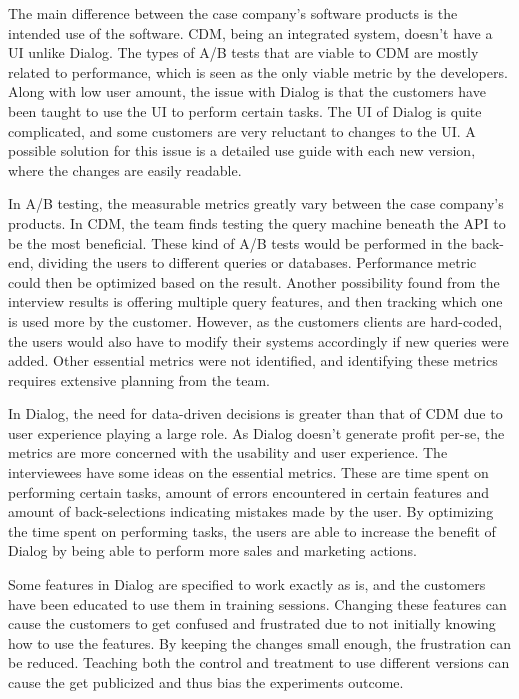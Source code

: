 \documentclass[english]{tktltiki2}
\theoremstyle{definition}
\theoremstyle{remark}
\begin{document}
The main difference between the case company's software products is the intended use of the software. CDM, being an integrated system, doesn't have a UI unlike Dialog. The types of A/B tests that are viable to CDM are mostly related to performance, which is seen as the only viable metric by the developers. Along with low user amount, the issue with Dialog is that the customers have been taught to use the UI to perform certain tasks. The UI of Dialog is quite complicated, and some customers are very reluctant to changes to the UI. A possible solution for this issue is a detailed use guide with each new version, where the changes are easily readable. 

In A/B testing, the measurable metrics greatly vary between the case company's products. In CDM, the team finds testing the query machine beneath the API to be the most beneficial. These kind of A/B tests would be performed in the back-end, dividing the users to different queries or databases. Performance metric could then be optimized based on the result. Another possibility found from the interview results is offering multiple query features, and then tracking which one is used more by the customer. However, as the customers clients are hard-coded, the users would also have to modify their systems accordingly if new queries were added. Other essential metrics were not identified, and identifying these metrics requires extensive planning from the team.

In Dialog, the need for data-driven decisions is greater than that of CDM due to user experience playing a large role. As Dialog doesn't generate profit per-se, the metrics are more concerned with the usability and user experience. The interviewees have some ideas on the essential metrics. These are time spent on performing certain tasks, amount of errors encountered in certain features and amount of back-selections indicating mistakes made by the user. By optimizing the time spent on performing tasks, the users are able to increase the benefit of Dialog by being able to perform more sales and marketing actions.

Some features in Dialog are specified to work exactly as is, and the customers have been educated to use them in training sessions. Changing these features can cause the customers to get confused and frustrated due to not initially knowing how to use the features. By keeping the changes small enough, the frustration can be reduced. Teaching both the control and treatment to use different versions can cause the get publicized and thus bias the experiments outcome.   
\end{document}
